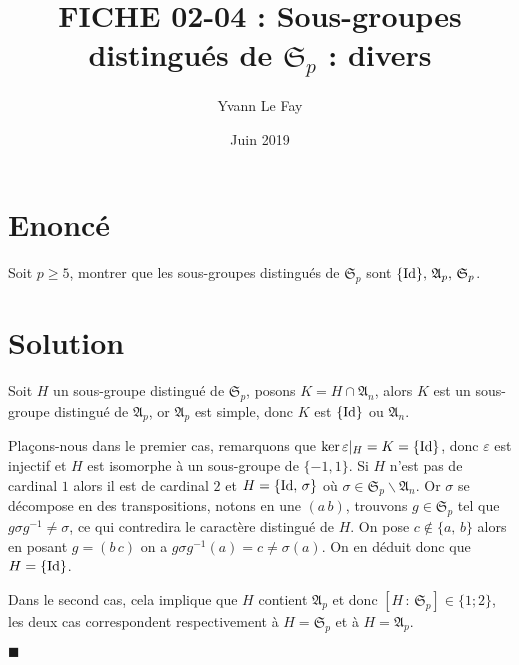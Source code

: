 \documentclass{article}
\newcommand*{\QED}{\hfill\ensuremath{\blacksquare}}%
\begin{document}
\title{FICHE 02-04 : Sous-groupes distingués de $\mathfrak{S}_p$ : divers}
\author{Yvann Le Fay}
\date{Juin 2019}
\maketitle
\section*{Enoncé}
Soit $p\geq 5$, montrer que les sous-groupes distingués de $\mathfrak{S}_p$ sont $\{\textup{Id}\},\, \mathfrak{A}_p,\, \mathfrak{S}_p$.

\section*{Solution}
Soit $H$ un sous-groupe distingué de $\mathfrak{S}_p$, posons $K=H\cap \mathfrak{A}_n$, alors $K$ est un sous-groupe distingué de $\mathfrak{A}_p$, or $\mathfrak{A}_p$ est simple, donc $K$ est $\{\textup{Id}\}$ ou $\mathfrak{A}_n$. 

Plaçons-nous dans le premier cas, remarquons que $\ker \varepsilon|_{H} = K = \{\textup{Id}\}$, donc $\varepsilon$ est injectif et $H$ est isomorphe à un sous-groupe de $\{-1,1\}$. Si $H$ n'est pas de cardinal $1$ alors il est de cardinal $2$ et $H = \{\textup{Id},\, \sigma\}$ où $\sigma\in \mathfrak{S}_p\backslash\mathfrak{A}_n$. Or $\sigma$ se décompose en des transpositions, notons en une $(a\, b)$, trouvons $g\in\mathfrak{S}_p$ tel que $g\sigma g^{-1}\neq \sigma$, ce qui contredira le caractère distingué de $H$. On pose $c\notin\{a,\,b\}$ alors en posant $g=(b\, c)$ on a $g\sigma g^{-1}(a) = c \neq \sigma(a)$. On en déduit donc que $H=\{\textup{Id}\}$.

Dans le second cas, cela implique que $H$ contient $\mathfrak{A}_p$ et donc $[H\,:\,\mathfrak{S}_p]\in\{1;2\}$, les deux cas correspondent respectivement à $H = \mathfrak{S}_p$ et à $H = \mathfrak{A}_p$.

\QED
\end{document}
